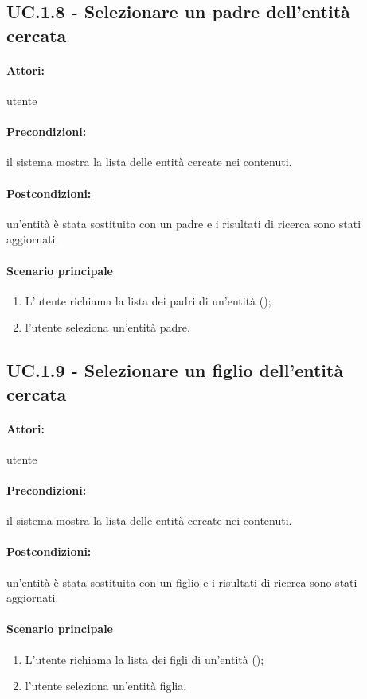 \documentclass[10pt,a4paper,headinclude,footinclude,hidelinks]{scrreprt} %
\begin{document}
	\subsection[UC.1.8]{UC.1.8 - Selezionare un padre dell'entità cercata}
	\label{sec:stage:ar:uc:1_8}
	\paragraph{Attori:} utente
	\paragraph{Precondizioni:} il sistema mostra la lista delle entità cercate nei contenuti.
	\paragraph{Postcondizioni:} un'entità è stata sostituita con un padre e i risultati di ricerca sono stati aggiornati.
	\paragraph{Scenario principale}
	\begin{enumerate}
	\item L'utente richiama la lista dei padri di un'entità ();
	\item l'utente seleziona un'entità padre.
	\end{enumerate}

	\subsection[UC.1.9]{UC.1.9 - Selezionare un figlio dell'entità cercata}
	\label{sec:stage:ar:uc:1_9}
	\paragraph{Attori:} utente
	\paragraph{Precondizioni:} il sistema mostra la lista delle entità cercate nei contenuti.
	\paragraph{Postcondizioni:} un'entità è stata sostituita con un figlio e i risultati di ricerca sono stati aggiornati.
	\paragraph{Scenario principale}
	\begin{enumerate}
	\item L'utente richiama la lista dei figli di un'entità ();
	\item l'utente seleziona un'entità figlia.
	\end{enumerate}
\end{document}
